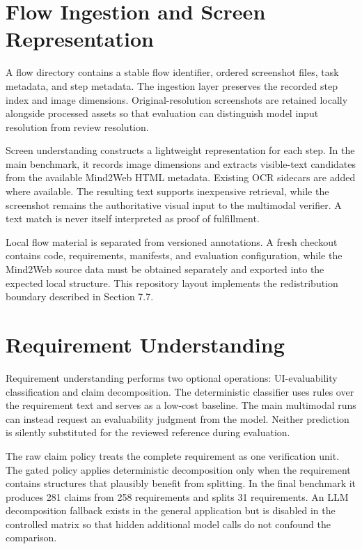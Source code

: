 \section{Flow Ingestion and Screen Representation}\label{flow-ingestion-and-screen-representation}

A flow directory contains a stable flow identifier, ordered screenshot files,
task metadata, and step metadata. The ingestion layer preserves the recorded
step index and image dimensions. Original-resolution screenshots are retained
locally alongside processed assets so that evaluation can distinguish model
input resolution from review resolution.

Screen understanding constructs a lightweight representation for each step. In
the main benchmark, it records image dimensions and extracts visible-text
candidates from the available Mind2Web HTML metadata. Existing OCR sidecars are
added where available. The resulting text supports inexpensive retrieval, while
the screenshot remains the authoritative visual input to the multimodal
verifier. A text match is never itself interpreted as proof of fulfillment.

Local flow material is separated from versioned annotations. A fresh checkout
contains code, requirements, manifests, and evaluation configuration, while the
Mind2Web source data must be obtained separately and exported into the expected
local structure. This repository layout implements the redistribution boundary
described in Section 7.7.

\section{Requirement Understanding}\label{requirement-understanding}

Requirement understanding performs two optional operations: UI-evaluability
classification and claim decomposition. The deterministic classifier uses
rules over the requirement text and serves as a low-cost baseline. The main
multimodal runs can instead request an evaluability judgment from the model.
Neither prediction is silently substituted for the reviewed reference during
evaluation.

The raw claim policy treats the complete requirement as one verification unit.
The gated policy applies deterministic decomposition only when the requirement
contains structures that plausibly benefit from splitting. In the final
benchmark it produces 281 claims from 258 requirements and splits 31
requirements. An LLM decomposition fallback exists in the general application
but is disabled in the controlled matrix so that hidden additional model calls
do not confound the comparison.

